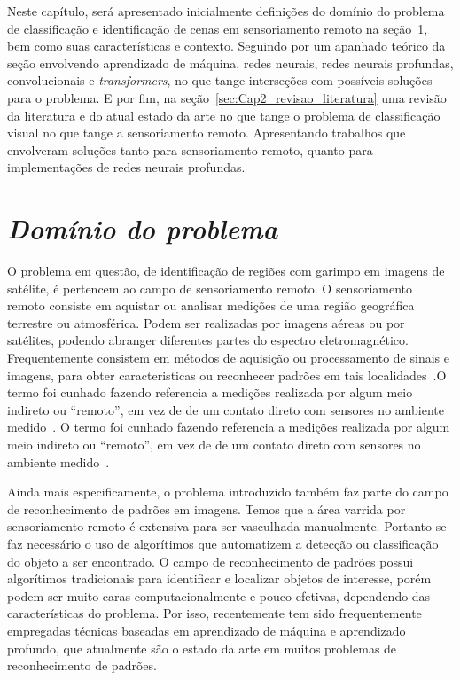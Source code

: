 Neste capítulo, será apresentado inicialmente definições do domínio do problema de classificação e identificação de cenas em sensoriamento remoto na seção~\ref{sec:Cap2_dominio}, bem como suas características e contexto. Seguindo por um apanhado teórico da seção envolvendo aprendizado de máquina, redes neurais, redes neurais profundas, convolucionais e \textit{transformers}, no que tange interseções com possíveis soluções para o problema. E por fim, na seção~\ref{sec:Cap2_revisao_literatura} uma revisão da literatura e do atual estado da arte no que tange o problema de classificação visual no que tange a sensoriamento remoto. Apresentando trabalhos que envolveram soluções tanto para sensoriamento remoto, quanto para implementações de redes neurais profundas.



\section{\textit{Domínio do problema}}\label{sec:Cap2_dominio}


O problema em questão, de identificação de regiões com garimpo em imagens de satélite, é pertencem ao campo de sensoriamento remoto. O sensoriamento remoto consiste em aquistar ou analisar medições de uma região geográfica terrestre ou atmosférica. Podem ser realizadas por imagens aéreas ou por satélites, podendo abranger diferentes partes do espectro eletromagnético.
Frequentemente consistem em métodos de aquisição ou processamento de sinais e imagens, para obter caracteristicas ou reconhecer padrões em tais localidades~\cite{emery2017introduction}.O termo foi cunhado fazendo referencia a medições realizada por algum meio indireto ou “remoto”, em vez de de um contato direto com sensores no ambiente medido~\cite{emery2017introduction}. O termo foi cunhado fazendo referencia a medições realizada por algum meio indireto ou “remoto”, em vez de de um contato direto com sensores no ambiente medido~\cite{emery2017introduction}.

Ainda mais especificamente, o problema introduzido também faz parte do campo de reconhecimento de padrões em imagens. Temos que a área varrida por sensoriamento remoto é extensiva para ser vasculhada manualmente. Portanto se faz necessário o uso de algorítimos que automatizem a detecção ou classificação do objeto a ser encontrado.
O campo de reconhecimento de padrões possui algorítimos tradicionais para identificar e localizar objetos de interesse, porém podem ser muito caras computacionalmente e pouco efetivas, dependendo das características do problema. Por isso, recentemente tem sido frequentemente empregadas técnicas baseadas em aprendizado de máquina e aprendizado profundo, que atualmente são o estado da arte em muitos problemas de reconhecimento de padrões.


